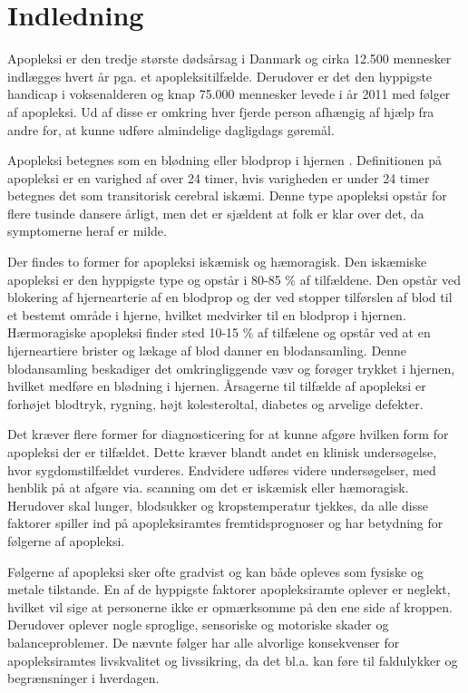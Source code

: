 \section{Indledning}
Apopleksi er den tredje største dødsårsag i Danmark og cirka 12.500 mennesker indlægges hvert år pga. et apopleksitilfælde. Derudover er det den hyppigste handicap i voksenalderen og knap 75.000 mennesker levede i år 2011 med følger af apopleksi. Ud af disse er omkring hver fjerde person afhængig af hjælp fra andre for, at kunne udføre almindelige dagligdags gøremål. \cite{Hjernesagen2015a}

Apopleksi betegnes som en blødning eller blodprop i hjernen \cite{Hjernesagen2015a}. Definitionen på apopleksi er en varighed af over 24 timer, hvis varigheden er under 24 timer betegnes det som transitorisk cerebral iskæmi. Denne type apopleksi opstår for flere tusinde dansere årligt, men det er sjældent at folk er klar over det, da symptomerne heraf er milde.

Der findes to former for apopleksi iskæmisk og hæmoragisk.
Den iskæmiske apopleksi er den hyppigste type og opstår i 80-85 \% af tilfældene. Den opstår ved blokering af hjernearterie af en blodprop og der ved stopper tilførslen af blod til et bestemt område i hjerne, hvilket medvirker til en blodprop i hjernen.
Hærmoragiske apopleksi finder sted 10-15 \% af tilfælene og opstår ved at en hjerneartiere brister og lækage af blod danner en blodansamling. Denne blodansamling beskadiger det omkringliggende væv og forøger trykket i hjernen, hvilket medføre en blødning i hjernen.
Årsagerne til tilfælde af apopleksi er forhøjet blodtryk, rygning, højt kolesteroltal, diabetes og arvelige defekter.

Det kræver flere former for diagnosticering for at kunne afgøre hvilken form for apopleksi der er tilfældet. Dette kræver blandt andet en klinisk undersøgelse, hvor sygdomstilfældet vurderes. Endvidere udføres videre undersøgelser, med henblik på at afgøre  via. scanning om det er iskæmisk eller hæmoragisk. Herudover skal lunger, blodsukker og kropstemperatur tjekkes, da alle disse faktorer spiller ind på apopleksiramtes fremtidsprognoser og har betydning for  følgerne af apopleksi. 

Følgerne af apopleksi sker ofte gradvist og kan både opleves som fysiske og metale tilstande. En af de hyppigste faktorer apopleksiramte oplever er neglekt, hvilket vil sige at personerne ikke er opmærksomme på den ene side af kroppen. Derudover oplever nogle sproglige, sensoriske og motoriske skader og balanceproblemer. De nævnte følger har alle alvorlige konsekvenser for apopleksiramtes livskvalitet og livssikring, da det bl.a. kan føre til faldulykker og begrænsninger i hverdagen. 

